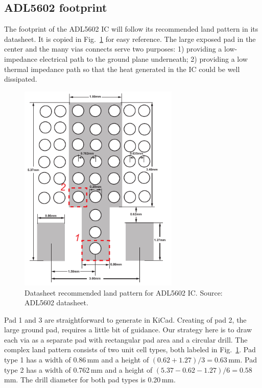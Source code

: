 \documentclass[12pt,letterpaper]{scrartcl}
\begin{document}

\subsection{ADL5602 footprint}
The footprint of the ADL5602 IC will follow its recommended land pattern in its datasheet. It is copied in Fig.~\ref{fig:adl5602-landpattern} for easy reference. The large exposed pad in the center and the many vias connects serve two purposes: 1) providing a low-impedance electrical path to the ground plane underneath; 2) providing a low thermal impedance path so that the heat generated in the IC could be well dissipated. 

\begin{figure}[ph]
	\centering
	\includegraphics[width=3in]{adl5602-landpattern}
	\caption{Datasheet recommended land pattern for ADL5602 IC. Source: ADL5602 datasheet.}
	\label{fig:adl5602-landpattern}
\end{figure}

Pad 1 and 3 are straightforward to generate in KiCad. Creating of pad 2, the large ground pad, requires a little bit of guidance. Our strategy here is to draw each via as a separate pad with rectangular pad area and a circular drill. The complex land pattern consists of two unit cell types, both labeled  in Fig.~\ref{fig:adl5602-landpattern}. Pad type 1 has a width of 0.86\,mm and a height of $(0.62+1.27)/3=0.63$\,mm. Pad type 2 has a width of 0.762\,mm and a height of $(5.37-0.62-1.27)/6=0.58$\,mm. The drill diameter for both pad types is 0.20\,mm. 
\end{document}
